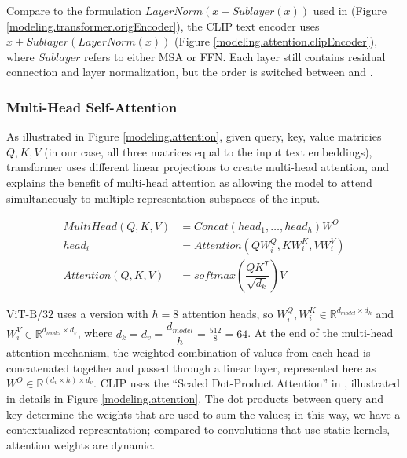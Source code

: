 Compare to the formulation $LayerNorm(x + Sublayer(x))$ used in \cite{attentionAllYouNeed} (Figure \ref{modeling.transformer.origEncoder}), the CLIP text encoder uses $x + Sublayer(LayerNorm(x))$ (Figure \ref{modeling.attention.clipEncoder}), where $Sublayer$ refers to either MSA or FFN. Each layer still contains residual connection and layer normalization, but the order is switched between \cite{attentionAllYouNeed} and \cite{CLIPpaper}. 

\subsubsection*{Multi-Head Self-Attention}
As illustrated in Figure \ref{modeling.attention}, given query, key, value matricies $Q,K,V$ (in our case, all three matrices equal to the input text embeddings), transformer uses different linear projections to create multi-head attention, and \citet{attentionAllYouNeed} explains the benefit of multi-head attention as allowing the model to attend simultaneously to multiple representation subspaces of the input.      

\begin{equation} \label{mha}
\begin{split}
    MultiHead(Q,K,V) & = Concat({head}_1,\dots,{head}_h)W^O \\
    {head}_i & = Attention(QW_i^{Q}, KW_i^{K}, VW_i^{V}) \\
    Attention(Q,K,V) & = softmax(\dfrac{QK^T}{\sqrt{d_k}})V 
\end{split}
\end{equation}

$\text{ViT-B}/32$ uses a version with $h = 8$ attention heads, so $W_i^{Q}, W_i^{K} \in \mathbb{R}^{d_{model} \times d_k}$ and $W_i^{V} \in \mathbb{R}^{d_{model} \times d_v}$, where $d_k = d_v = \dfrac{d_{model}}{h} = \frac{512}{8} = 64$. 
At the end of the multi-head attention mechanism, the weighted combination of values from each head is concatenated together and passed through a linear layer, represented here as $W^O \in \mathbb{R}^{(d_v \times h) \times d_v}$. 
CLIP uses the ``Scaled Dot-Product Attention'' in \cite{attentionAllYouNeed}, illustrated in details in Figure \ref{modeling.attention}. The dot products between query and key determine the weights that are used to sum the values; in this way, we have a contextualized representation; compared to convolutions that use static kernels, attention weights are dynamic.   


